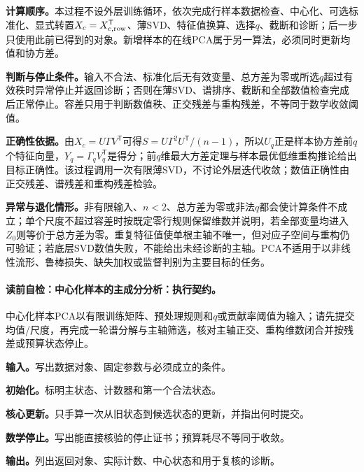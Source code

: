 \label{struct:V4-C04-CH23}
\textbf{计算顺序。}本过程不设外层训练循环，依次完成行样本数据检查、中心化、可选标准化、显式转置$X_c=X_{c,{\rm row}}^{\mathsf T}$、薄SVD、特征值换算、选择$q$、截断和诊断；后一步只使用此前已得到的对象。新增样本的在线PCA属于另一算法，必须同时更新均值和协方差。

\label{struct:V4-C04-CH24}
\textbf{判断与停止条件。}输入不合法、标准化后无有效变量、总方差为零或所选$q$超过有效秩时异常停止并返回诊断；否则在薄SVD、谱排序、截断和全部数值检查完成后正常停止。容差只用于判断数值秩、正交残差与重构残差，不等同于数学收敛阈值。

\label{struct:V4-C04-CH25}
\textbf{正确性依据。}由$X_c=U\Gamma V^{\mathsf T}$可得$S=U\Gamma^2U^{\mathsf T}/(n-1)$，所以$U_q$正是样本协方差前$q$个特征向量，$Y_q=\Gamma_qV_q^{\mathsf T}$是得分；前$q$维最大方差定理与样本最优低维重构推论给出目标正确性。该过程调用一次有限薄SVD，不讨论外层迭代收敛；数值正确性由正交残差、谱残差和重构残差检验。

\textbf{异常与退化情形。}非有限输入、$n<2$、总方差为零或非法$q$都会使计算条件不成立；单个尺度不超过容差时按既定零行规则保留维数并说明，若全部变量均进入$Z_0$则等价于总方差为零。重复特征值使单根主轴不唯一，但对应子空间与重构仍可验证；若底层SVD数值失败，不能给出未经诊断的主轴。PCA不适用于以非线性流形、鲁棒损失、缺失加权或监督判别为主要目标的任务。

\label{struct:V4-C04-CH19}
\paragraph{读前自检：中心化样本的主成分分析：执行契约。}中心化样本PCA以有限训练矩阵、预处理规则和$q$或贡献率阈值为输入；请先提交均值/尺度，再完成一轮谱分解与主轴筛选，核对主轴正交、重构维数闭合并按残差或预算状态停止。\par
\begin{keypointbox}[title={中心化样本的主成分分析：五步阅读}]
\textbf{输入。}写出数据对象、固定参数与必须成立的条件。\par
\textbf{初始化。}标明主状态、计数器和第一个合法状态。\par
\textbf{核心更新。}只手算一次从旧状态到候选状态的更新，并指出何时提交。\par
\textbf{数学停止。}写出能直接核验的停止证书；预算耗尽不等同于收敛。\par
\textbf{输出。}列出返回对象、实际计数、中心状态和用于复核的诊断。
\end{keypointbox}

